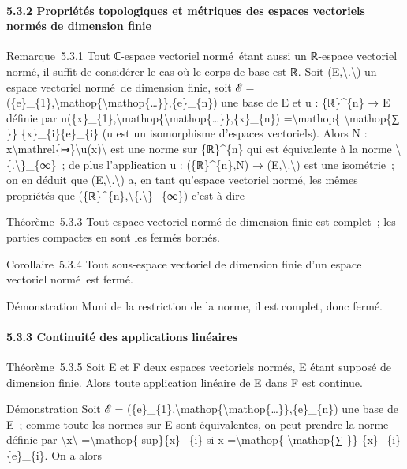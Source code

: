\documentclass[]{article}
\begin{document}
\paragraph{5.3.2 Propriétés topologiques et métriques des espaces
vectoriels normés de dimension finie}

Remarque~5.3.1 Tout ℂ-espace vectoriel normé~étant aussi un ℝ-espace
vectoriel normé, il suffit de considérer le cas où le corps de base est
ℝ. Soit (E,\textbackslash{}\textbar{}.\textbackslash{}\textbar{}) un
espace vectoriel normé~de dimension finie, soit ℰ =
(\{e\}\_\{1\},\textbackslash{}mathop\{\textbackslash{}mathop\{\ldots{}\}\},\{e\}\_\{n\})
une base de E et u : \{ℝ\}\^{}\{n\} → E définie par
u(\{x\}\_\{1\},\textbackslash{}mathop\{\textbackslash{}mathop\{\ldots{}\}\},\{x\}\_\{n\})
=\textbackslash{}mathop\{ \textbackslash{}mathop\{∑ \}\}
\{x\}\_\{i\}\{e\}\_\{i\} (u est un isomorphisme d'espaces vectoriels).
Alors N :
x\textbackslash{}mathrel\{↦\}\textbackslash{}\textbar{}u(x)\textbackslash{}\textbar{}
est une norme sur \{ℝ\}\^{}\{n\} qui est équivalente à la norme
\textbackslash{}\textbar{}\{.\textbackslash{}\textbar{}\}\_\{∞\}~; de
plus l'application u : (\{ℝ\}\^{}\{n\},N) →
(E,\textbackslash{}\textbar{}.\textbackslash{}\textbar{}) est une
isométrie~; on en déduit que
(E,\textbackslash{}\textbar{}.\textbackslash{}\textbar{}) a, en tant
qu'espace vectoriel normé, les mêmes propriétés que
(\{ℝ\}\^{}\{n\},\textbackslash{}\textbar{}\{.\textbackslash{}\textbar{}\}\_\{∞\})
c'est-à-dire

Théorème~5.3.3 Tout espace vectoriel normé de dimension finie est
complet~; les parties compactes en sont les fermés bornés.

Corollaire~5.3.4 Tout sous-espace vectoriel de dimension finie d'un
espace vectoriel normé~est fermé.

Démonstration Muni de la restriction de la norme, il est complet, donc
fermé.

\paragraph{5.3.3 Continuité des applications linéaires}

Théorème~5.3.5 Soit E et F deux espaces vectoriels normés, E étant
supposé de dimension finie. Alors toute application linéaire de E dans F
est continue.

Démonstration Soit ℰ =
(\{e\}\_\{1\},\textbackslash{}mathop\{\textbackslash{}mathop\{\ldots{}\}\},\{e\}\_\{n\})
une base de E~; comme toute les normes sur E sont équivalentes, on peut
prendre la norme définie par
\textbackslash{}\textbar{}x\textbackslash{}\textbar{}
=\textbackslash{}mathop\{ sup\}\textbar{}\{x\}\_\{i\}\textbar{} si x
=\textbackslash{}mathop\{ \textbackslash{}mathop\{∑ \}\}
\{x\}\_\{i\}\{e\}\_\{i\}. On a alors
\end{document}

